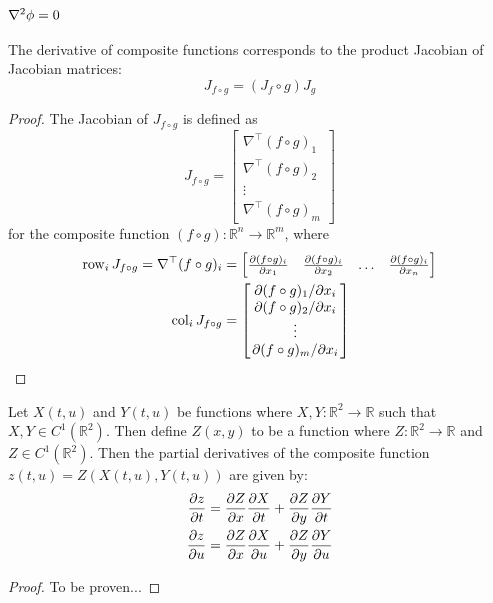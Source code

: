 \subsubsection{$\laplacian{\phi}=0$}\label{sec:deltaphizero}
\begin{lemma}
	The derivative of composite functions corresponds to the product Jacobian of Jacobian matrices:
	$$J_{f\circ g}=(J_f\circ g)J_g$$
\end{lemma}
\begin{proof}
	The Jacobian of $J_{f\circ g}$ is defined as
	$$
		J_{f\circ g}=
		\begin{bmatrix}
			\nabla^\top(f\circ g)_1 \\
			\nabla^\top(f\circ g)_2 \\
			\vdots				    \\
			\nabla^\top(f\circ g)_m
		\end{bmatrix}
	$$
	for the composite function $(f\circ g):\mathbb{R}^n\rightarrow\mathbb{R}^m$, where
	\begin{align*}		
		\operatorname{row}_{i}J_{f\circ g}=\nabla^\top(f\circ g)_i&=\begin{bmatrix}
			\pdv{(f\circ g)_i}{x_1} & \pdv{(f\circ g)_i}{x_2} & \hdots & \pdv{(f\circ g)_i}{x_n}
		\end{bmatrix}\\
		\operatorname{col}_{i}J_{f\circ g}&=\begin{bmatrix}
			\pdv*{(f\circ g)_1}{x_i} \\ \pdv*{(f\circ g)_2}{x_i} \\ \vdots \\ \pdv*{(f\circ g)_m}{x_i}
		\end{bmatrix}
	\end{align*}
\end{proof}

\begin{lemma}
Let $X(t,u)$ and $Y(t,u)$ be functions where $X,Y:\mathbb{R}^2\rightarrow\mathbb{R}$ such that $X,Y\in C^1(\mathbb{R}^2)$. Then define $Z(x,y)$ to be a function where $Z:\mathbb{R}^2\rightarrow\mathbb{R}$ and $Z\in C^1(\mathbb{R}^2)$. Then the partial derivatives of the composite function $z(t,u)=Z(X(t,u),Y(t,u))$ are given by:
\begin{align*}
	\pdv{z}{t}&=\pdv{Z}{x}\pdv{X}{t}+\pdv{Z}{y}\pdv{Y}{t}\\
	\pdv{z}{u}&=\pdv{Z}{x}\pdv{X}{u}+\pdv{Z}{y}\pdv{Y}{u}
\end{align*}
\end{lemma}
\begin{proof}
	To be proven...
\end{proof}

